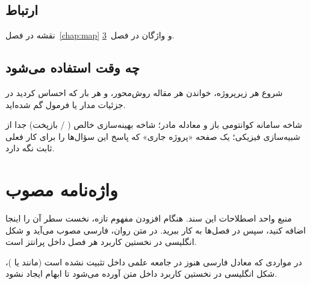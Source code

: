 \section{ارتباط}

نقشه در فصل~\ref{chap:map} و واژگان در فصل~\ref{chap:glossary}.

\section{چه وقت استفاده می‌شود}

شروع هر زیرپروژه، خواندن هر مقاله روش‌محور، و هر بار که احساس کردید در جزئیات مدار یا فرمول گم شده‌اید.

\begin{remark}
شاخه سامانه کوانتومی باز و معادله مادر؛ شاخه بهینه‌سازی خالص ( / بازپخت) جدا از شبیه‌سازی فیزیکی؛ یک صفحه «پروژه جاری» که پاسخ این سؤال‌ها را برای کار فعلی ثابت نگه دارد.
\end{remark}

\chapter{واژه‌نامه مصوب}
\label{chap:glossary}

منبع واحد اصطلاحات این سند. هنگام افزودن مفهوم تازه، نخست سطر آن را اینجا اضافه کنید، سپس در فصل‌ها به کار ببرید. در متن روان، فارسی مصوب می‌آید و شکل انگلیسی در نخستین کاربرد هر فصل داخل پرانتز است.

\begin{remark}
در مواردی که معادل فارسی هنوز در جامعه علمی داخل تثبیت نشده است (مانند
یا
)،
شکل انگلیسی در نخستین کاربرد داخل متن آورده می‌شود تا ابهام ایجاد نشود.
\end{remark}

